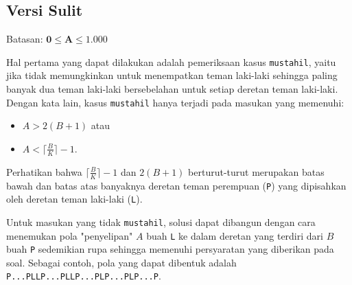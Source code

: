 \documentclass[../main_editorial.tex]{subfiles} %
\begin{document}
\subsection*{Versi Sulit}

Batasan: $\mathbf{0 \le A \le 1.000}$

Hal pertama yang dapat dilakukan adalah pemeriksaan kasus \texttt{mustahil}, yaitu jika tidak memungkinkan untuk menempatkan teman laki-laki sehingga paling banyak dua teman laki-laki bersebelahan untuk setiap deretan teman laki-laki. Dengan kata lain, kasus \texttt{mustahil} hanya terjadi pada masukan yang memenuhi:
\begin{itemize}
	\item $A > 2(B + 1)$ atau
	\item $A < \lceil \frac{B}{K} \rceil - 1$.
\end{itemize}

Perhatikan bahwa $\lceil \frac{B}{K} \rceil - 1$ dan $2(B + 1)$ berturut-turut merupakan batas bawah dan batas atas banyaknya deretan teman perempuan (\texttt{P}) yang dipisahkan oleh deretan teman laki-laki (\texttt{L}).

Untuk masukan yang tidak \texttt{mustahil}, solusi dapat dibangun dengan cara menemukan pola "penyelipan" $A$ buah \texttt{L} ke dalam deretan yang terdiri dari $B$ buah \texttt{P} sedemikian rupa sehingga memenuhi persyaratan yang diberikan pada soal. Sebagai contoh, pola yang dapat dibentuk adalah \texttt{P...PLLP...PLLP...PLP...PLP...P}.
\end{document}
